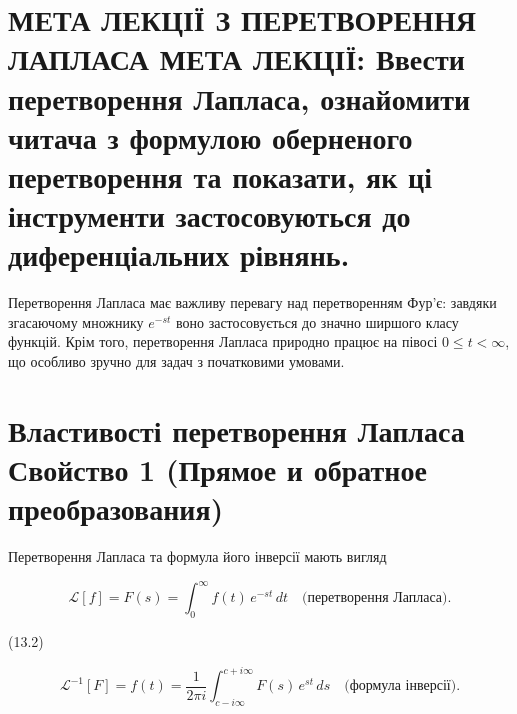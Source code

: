 \documentclass[
  ukrainian,
]{article}
\begin{document}
\section{МЕТА ЛЕКЦІЇ З ПЕРЕТВОРЕННЯ ЛАПЛАСА МЕТА ЛЕКЦІЇ: Ввести
перетворення Лапласа, ознайомити читача з формулою оберненого
перетворення та показати, як ці інструменти застосовуються до
диференціальних
рівнянь.}\label{ux43cux435ux442ux430-ux43bux435ux43aux446ux456ux457-ux437-ux43fux435ux440ux435ux442ux432ux43eux440ux435ux43dux43dux44f-ux43bux430ux43fux43bux430ux441ux430-ux43cux435ux442ux430-ux43bux435ux43aux446ux456ux457-ux432ux432ux435ux441ux442ux438-ux43fux435ux440ux435ux442ux432ux43eux440ux435ux43dux43dux44f-ux43bux430ux43fux43bux430ux441ux430-ux43eux437ux43dux430ux439ux43eux43cux438ux442ux438-ux447ux438ux442ux430ux447ux430-ux437-ux444ux43eux440ux43cux443ux43bux43eux44e-ux43eux431ux435ux440ux43dux435ux43dux43eux433ux43e-ux43fux435ux440ux435ux442ux432ux43eux440ux435ux43dux43dux44f-ux442ux430-ux43fux43eux43aux430ux437ux430ux442ux438-ux44fux43a-ux446ux456-ux456ux43dux441ux442ux440ux443ux43cux435ux43dux442ux438-ux437ux430ux441ux442ux43eux441ux43eux432ux443ux44eux442ux44cux441ux44f-ux434ux43e-ux434ux438ux444ux435ux440ux435ux43dux446ux456ux430ux43bux44cux43dux438ux445-ux440ux456ux432ux43dux44fux43dux44c.}

Перетворення Лапласа має важливу перевагу над перетворенням Фур'є:
завдяки згасаючому множнику \(e^{-st}\) воно застосовується до значно
ширшого класу функцій. Крім того, перетворення Лапласа природно працює
на півосі \(0 \le t < \infty\), що особливо зручно для задач з
початковими умовами.

\section{Властивості перетворення Лапласа Свойство 1 (Прямое и обратное
преобразования)}\label{ux432ux43bux430ux441ux442ux438ux432ux43eux441ux442ux456-ux43fux435ux440ux435ux442ux432ux43eux440ux435ux43dux43dux44f-ux43bux430ux43fux43bux430ux441ux430-ux441ux432ux43eux439ux441ux442ux432ux43e-1-ux43fux440ux44fux43cux43eux435-ux438-ux43eux431ux440ux430ux442ux43dux43eux435-ux43fux440ux435ux43eux431ux440ux430ux437ux43eux432ux430ux43dux438ux44f}

Перетворення Лапласа та формула його інверсії мають вигляд

\[
\mathscr{L}[f] = F(s) = \int_{0}^{\infty} f(t) \, e^{-st} \, dt
\quad \text{(перетворення Лапласа).}
\]

(13.2)

\[
\mathscr{L}^{-1}[F] = f(t) = \frac{1}{2\pi i} \int_{c-i\infty}^{c+i\infty} F(s) \, e^{st} \, ds
\quad \text{(формула інверсії).}
\]
\end{document}
